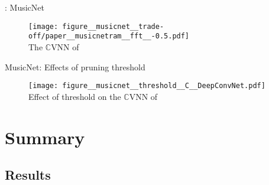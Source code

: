 \documentclass{beamer}
\newcommand{\real}{\mathbb{R}}
\newcommand{\cplx}{\mathbb{C}}
\begin{document}
\begin{frame}[c]{\insertsection: MusicNet}
  \begin{figure}[t]
    \centering
    \texttt{[image: figure\_\_musicnet\_\_trade-off/paper\_\_musicnetram\_\_fft\_\_-0.5.pdf]}
    \\
    {The $\cplx$VNN of \citet{trabelsi_deep_2018}}
  \end{figure}


\end{frame}

\begin{frame}[c]{MusicNet: Effects of pruning threshold}
  \begin{figure}[t]
    \centering
    \texttt{[image: figure\_\_musicnet\_\_threshold\_\_C\_\_DeepConvNet.pdf]}
    \\
    {Effect of threshold on the $\cplx$VNN of \citet{trabelsi_deep_2018}}
  \end{figure}

\end{frame}


\section{Summary} %
\label{sec:summary}

\subsection{Results} %
\label{sub:results}
\end{document}
